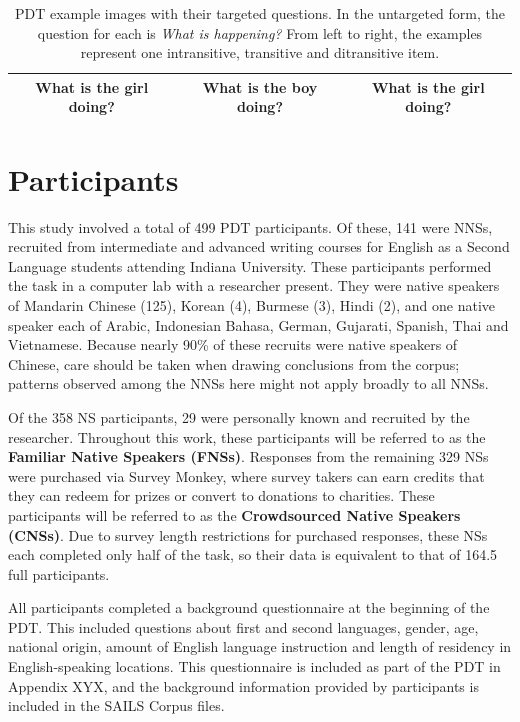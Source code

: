 \begin{table}[htb!]
\begin{center}
\begin{tabular}{|c|c|c|}
\hline
What is the girl doing? & What is the boy doing? & What is the girl doing? \\
\hline
\end{tabular}
\caption{\label{tab:example-pdt-items} PDT example images with their targeted questions. In the untargeted form, the question for each is \textit{What is happening?} From left to right, the examples represent one intransitive, transitive and ditransitive item.}
\end{center}
\end{table}


\section{Participants}
\label{sec:participants}

This study involved a total of 499 PDT participants. Of these, 141 were NNSs, recruited from intermediate and advanced writing courses for English as a Second Language students attending Indiana University. These participants performed the task in a computer lab with a researcher present. They were native speakers of Mandarin Chinese (125), Korean (4), Burmese (3), Hindi (2), and one native speaker each of Arabic, Indonesian Bahasa, German, Gujarati, Spanish, Thai and Vietnamese. Because nearly 90\% of these recruits were native speakers of Chinese, care should be taken when drawing conclusions from the corpus; patterns observed among the NNSs here might not apply broadly to all NNSs. 

Of the 358 NS participants, 29 were personally known and recruited by the researcher. Throughout this work, these participants will be referred to as the \textbf{Familiar Native Speakers (FNSs)}. Responses from the remaining 329 NSs were purchased via Survey Monkey, where survey takers can earn credits that they can redeem for prizes or convert to donations to charities. These participants will be referred to as the \textbf{Crowdsourced Native Speakers (CNSs)}. Due to survey length restrictions for purchased responses, these NSs each completed only half of the task, so their data is equivalent to that of 164.5 full participants.

All participants completed a background questionnaire at the beginning of the PDT. This included questions about first and second languages, gender, age, national origin, amount of English language instruction and length of residency in English-speaking locations. This questionnaire is included as part of the PDT in Appendix XYX, and the background information  provided by participants is included in the SAILS Corpus files. 

